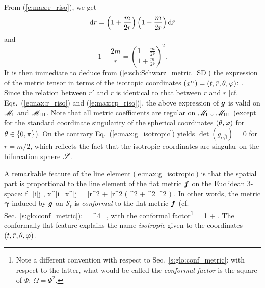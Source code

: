 From (\ref{e:max:r_riso}), we get
\[
    \mathrm{d} r = \left( 1 + \frac{m}{2\bar{r}} \right) \left( 1 - \frac{m}{2\bar{r}} \right)
        \mathrm{d} \bar{r}
\]
and
\[
    1 - \frac{2m}{r} = \left(
        \frac{ 1 - \frac{m}{2\bar{r}}}{1 + \frac{m}{2\bar{r}}} \right) ^2 .
\]
It is then immediate to deduce from (\ref{e:sch:Schwarz_metric_SD})
the expression of the metric tensor in
terms of the isotropic coordinates $(x^{\bar{\alpha}}) = (t,\bar{r},\theta,\varphi)$:
\be \label{e:max:g_isotropic}
    .
\ee
Since the relation between $r'$ and $\bar{r}$ is identical to that between
$r$ and $\bar{r}$ [cf. Eqs.~(\ref{e:max:r_riso}) and (\ref{e:max:rp_riso})],
the above expression of $\bm{g}$ is valid on $\mathscr{M}_{\rm I}$ and $\mathscr{M}_{\rm III}$.
Note that all metric coefficients are regular on $\mathscr{M}_{\rm I}\cup\mathscr{M}_{\rm III}$
(except for the standard coordinate singularity of the spherical coordinates
$(\theta,\varphi)$ for $\theta\in\{0,\pi\}$). On the contrary Eq.~(\ref{e:max:g_isotropic})
yields $\det(g_{\bar{\alpha}\bar{\beta}}) = 0$ for $\bar{r}=m/2$, which reflects the fact that
the isotropic coordinates are singular on the bifurcation sphere $\mathscr{S}$.

A remarkable feature of the line element (\ref{e:max:g_isotropic}) is
that the spatial part is proportional to
the line element of the flat metric $\bm{f}$ on the Euclidean 3-space:
\be
    f_{\bar{i}\bar{j}} , \D x^{\bar{i}} \, \D x^{\bar{j}} = \D \bar{r}^2 + \bar{r}^2 \left( \D\th^2 + \sin^2\th\, \D\ph^2 \right) .
\ee
In other words, the metric $\bm{\gamma}$ induced by $\bm{g}$ on $\mathcal{S}_t$
is \emph{conformal} to the flat metric $\bm{f}$
(cf. Sec.~\ref{s:glo:conf_metric}):
\be
    \w{\gamma} = \Psi^4 \,  ,
\ee
with the conformal factor\footnote{Note a different convention with respect
to Sec.~\ref{s:glo:conf_metric}: with respect to the latter, what would be
called the \emph{conformal factor} is the square of $\Psi$: $\Omega = \Psi^2$.}
\be
    \Psi = 1 +  .
\ee
The conformally-flat feature explains the name \emph{isotropic} given to the
coordinates $(t,\bar{r},\theta,\varphi)$.

